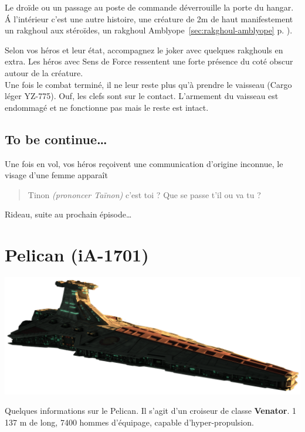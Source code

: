 Le droïde ou un passage au poste de commande déverrouille la porte du hangar. \'A l’intérieur c’est une autre histoire, une créature de 2m de haut manifestement un rakghoul aux stéroïdes, un rakghoul Amblyope~\ref{sec:rakghoul-amblyope} p. \pageref{sec:rakghoul-amblyope}).

Selon vos héros et leur état, accompagnez le joker avec quelques rakghouls en extra. Les héros avec Sens de Force ressentent une forte présence du coté obscur autour de la créature.\\

Une fois le combat terminé, il ne leur reste plus qu’à prendre le vaisseau (Cargo léger YZ-775). Ouf, les clefs sont sur le contact. L’armement du vaisseau est endommagé et ne fonctionne pas mais le reste est intact.

\subsection{To be continue\ldots}
Une fois en vol, vos héros reçoivent une communication d’origine inconnue, le visage d’une femme apparaît

\begin{quote}
	Tinon \emph{(prononcer Taïnon)} c’est toi ? Que se passe t’il ou va tu ?
\end{quote}

Rideau, suite au prochain épisode\ldots


\clearpage
\section{Pelican (iA-1701)}
\vspace{-2\baselineskip}
\includegraphics[width=\textwidth]{_img/dos-au-muur/venator.png}
\vspace{-5\baselineskip}

Quelques informations sur le Pelican. Il s’agit d’un croiseur de classe \textbf{Venator}. 1 137 m de long, 7400 hommes d’équipage, capable d’hyper-propulsion.

